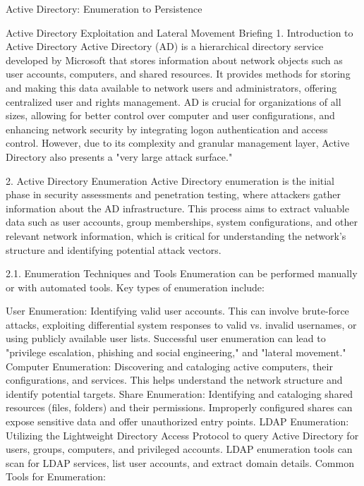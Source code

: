 Active Directory: Enumeration to Persistence

Active Directory Exploitation and Lateral Movement Briefing
1. Introduction to Active Directory
Active Directory (AD) is a hierarchical directory service developed by Microsoft that stores information about network objects such as user accounts, computers, and shared resources. It provides methods for storing and making this data available to network users and administrators, offering centralized user and rights management. AD is crucial for organizations of all sizes, allowing for better control over computer and user configurations, and enhancing network security by integrating logon authentication and access control. However, due to its complexity and granular management layer, Active Directory also presents a "very large attack surface."

2. Active Directory Enumeration
Active Directory enumeration is the initial phase in security assessments and penetration testing, where attackers gather information about the AD infrastructure. This process aims to extract valuable data such as user accounts, group memberships, system configurations, and other relevant network information, which is critical for understanding the network's structure and identifying potential attack vectors.

2.1. Enumeration Techniques and Tools
Enumeration can be performed manually or with automated tools. Key types of enumeration include:

User Enumeration: Identifying valid user accounts. This can involve brute-force attacks, exploiting differential system responses to valid vs. invalid usernames, or using publicly available user lists. Successful user enumeration can lead to "privilege escalation, phishing and social engineering," and "lateral movement."
Computer Enumeration: Discovering and cataloging active computers, their configurations, and services. This helps understand the network structure and identify potential targets.
Share Enumeration: Identifying and cataloging shared resources (files, folders) and their permissions. Improperly configured shares can expose sensitive data and offer unauthorized entry points.
LDAP Enumeration: Utilizing the Lightweight Directory Access Protocol to query Active Directory for users, groups, computers, and privileged accounts. LDAP enumeration tools can scan for LDAP services, list user accounts, and extract domain details.
Common Tools for Enumeration:


